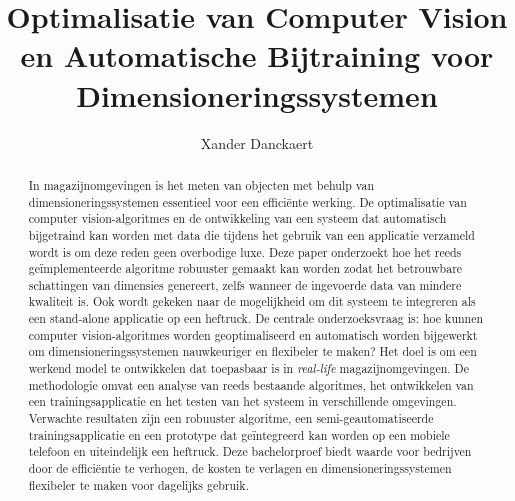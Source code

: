 \documentclass{hogent-article}
\title{Optimalisatie van Computer Vision en Automatische Bijtraining voor Dimensioneringssystemen}
\author{Xander Danckaert}
\begin{document}
\begin{abstract}
  In magazijnomgevingen is het meten van objecten met behulp van dimensioneringssystemen essentieel voor een efficiënte werking. De optimalisatie van computer vision-algoritmes en de ontwikkeling van een systeem dat automatisch bijgetraind kan worden met data die tijdens het gebruik van een applicatie verzameld wordt is om deze reden geen overbodige luxe. Deze paper onderzoekt hoe het reeds geïmplementeerde algoritme robuuster gemaakt kan worden zodat het betrouwbare schattingen van dimensies genereert, zelfs wanneer de ingevoerde data van mindere kwaliteit is. Ook wordt gekeken naar de mogelijkheid om dit systeem te integreren als een stand-alone applicatie op een heftruck. De centrale onderzoeksvraag is: hoe kunnen computer vision-algoritmes worden geoptimaliseerd en automatisch worden bijgewerkt om dimensioneringssystemen nauwkeuriger en flexibeler te maken? Het doel is om een werkend model te ontwikkelen dat toepasbaar is in \textit{real-life} magazijnomgevingen. De methodologie omvat een analyse van reeds bestaande algoritmes, het ontwikkelen van een trainingsapplicatie en het testen van het systeem in verschillende omgevingen. Verwachte resultaten zijn een robuuster algoritme, een semi-geautomatiseerde trainingsapplicatie en een prototype dat geïntegreerd kan worden op een mobiele telefoon en uiteindelijk een heftruck. Deze bachelorproef biedt waarde voor bedrijven door de efficiëntie te verhogen, de kosten te verlagen en dimensioneringssystemen flexibeler te maken voor dagelijks gebruik.
  
\end{abstract}
\tableofcontents



\printbibliography[heading=bibintoc]
\end{document}
